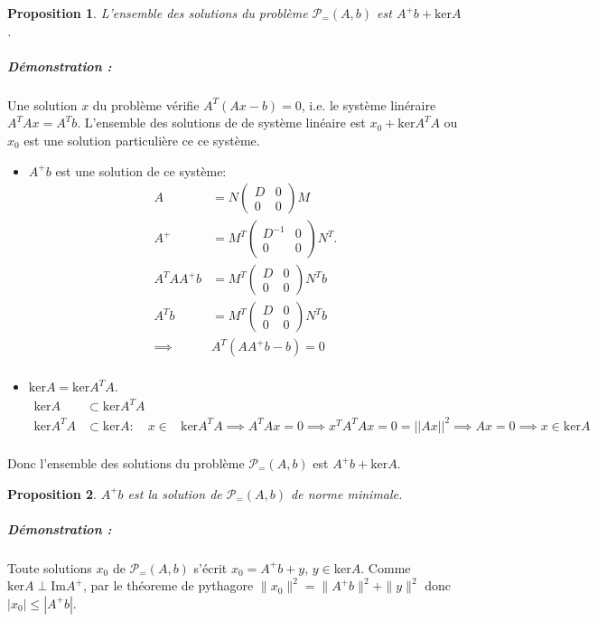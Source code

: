 \documentclass[10pt,a4paper]{article}
\newtheorem{prop}{Proposition}
\begin{document}
\begin{prop}
  L'ensemble des solutions du problème $\mathcal{P}_{=}(A, b)$ est $A^+b + \text{ker}A$.
\end{prop}
\subparagraph{Démonstration :}
  Une solution $x$ du problème vérifie $A^T(Ax-b)=0$, i.e.
le système linéraire $A^TAx = A^Tb$.
  L'ensemble des solutions de de système linéaire est $x_0 + \text{ker}A^TA$ ou $x_0$ est une solution particulière ce ce système.
\begin{itemize}
  \item $A^+b$ est une solution de ce système:
    \begin{align*}
      A &= N \left( \begin{matrix} D & 0 \\ 0 & 0 \end{matrix}\right) M\\
      A^+ &= M^T \left( \begin{matrix} D^{-1} & 0 \\ 0 & 0 \end{matrix}\right) N^T.\\
      A^T A A^+ b &= M^T \left( \begin{matrix} D & 0 \\ 0 & 0 \end{matrix}\right) N^T b\\
      A^T b &= M^T \left( \begin{matrix} D & 0 \\ 0 & 0 \end{matrix}\right) N^T b\\
      \implies& A^T(A A^+ b - b) = 0\\
    \end{align*}
  \item $\text{ker}A = \text{ker}A^TA$.
    \begin{align*}
      \text{ker}A &\subset \text{ker}A^TA\\
      \text{ker}A^TA &\subset \text{ker}A:\quad x \in &\text{ker}A^TA \implies A^TAx = 0 \implies x^TA^TAx = 0 = || Ax ||^2 \implies Ax = 0 \implies x \in \text{ker}A\\
    \end{align*}
\end{itemize}
Donc l'ensemble des solutions du problème $\mathcal{P}_{=}(A, b)$ est $A^+b + \text{ker}A$.

\begin{prop}
  $A^+b$ est la solution de $\mathcal{P}_{=}(A, b)$ de norme minimale.
\end{prop}
\subparagraph{Démonstration :}
  Toute solutions $x_0$ de $\mathcal{P}_{=}(A, b)$ s'écrit $x_0 = A^+b + y$, $y \in \text{ker}A$.
  Comme $\text{ker}A \perp \text{Im}A^+$, par le théoreme de pythagore $\|x_0 \|^2= \|A^+b \|^2 + \| y \|^2$ donc $|x_0| \leq |A^+b|$.
\end{document}
